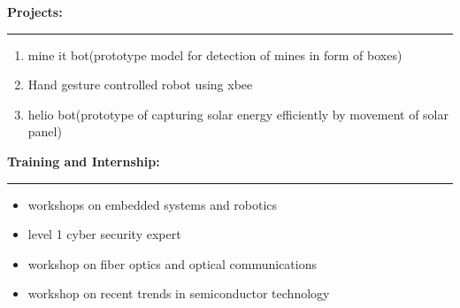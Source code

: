 \documentclass[a4paper,10pt]{article}
\begin{document}
\begin{flushleft}
		\bigskip
    \textbf{Projects:}\\
    \hrule
	\smallskip
      \begin{enumerate}
      	\item  mine it bot(prototype model for detection of mines in form of boxes)
      	\item  Hand gesture controlled robot using xbee
      	\item  helio bot(prototype of capturing solar energy efficiently by movement of solar panel) 
      \end{enumerate}
      \textbf{Training and Internship:}\\
  \hrule
   \begin{itemize}
   	\item  workshops on embedded systems and robotics\\
   	\item  level 1 cyber security expert\\
   	\item  workshop on fiber optics and optical communications\\
   	\item  workshop on recent trends in semiconductor technology\\
   \end{itemize}
	\end{flushleft}
	
\end{document}
